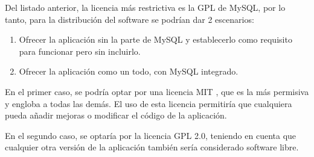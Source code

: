 Del listado anterior, la licencia más restrictiva es la GPL de MySQL, por lo tanto, para la distribución del software se podrían dar 2 escenarios:

\begin{enumerate}
	\item Ofrecer la aplicación sin la parte de MySQL y establecerlo como requisito para funcionar pero sin incluirlo.
	\item Ofrecer la aplicación como un todo, con MySQL integrado.
\end{enumerate}

En el primer caso, se podría optar por una licencia MIT , que es la más permisiva y engloba a todas las demás. 
El uso de esta licencia permitiría que cualquiera pueda añadir mejoras o modificar el código de la aplicación.

En el segundo caso, se optaría por la licencia GPL 2.0, teniendo en cuenta que cualquier otra versión de la aplicación también sería considerado software libre.


